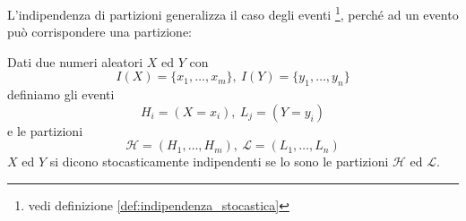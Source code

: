 L'indipendenza di partizioni generalizza il caso degli eventi
\footnote{vedi definizione \ref{def:indipendenza_stocastica}},
perché ad un evento può corrispondere una partizione:
\begin{definition}
  Dati due numeri aleatori \( X \) ed \( Y \) con
  \[
    I(X) = \{ x_1, \ldots, x_m \}, ~ I(Y) = \{ y_1, \ldots, y_n \}
  \]
  definiamo gli eventi
  \[
    H_i = (X = x_i), ~ L_j = (Y = y_i)
  \]
  e le partizioni
  \[
    \mathcal{H} = (H_1, \ldots, H_m), ~ \mathcal{L} = (L_1, \ldots, L_n)
  \]
  \( X \) ed \( Y \) si dicono stocasticamente indipendenti se lo sono le partizioni \( \mathcal{H} \) ed \( \mathcal{L} \).
\end{definition}
